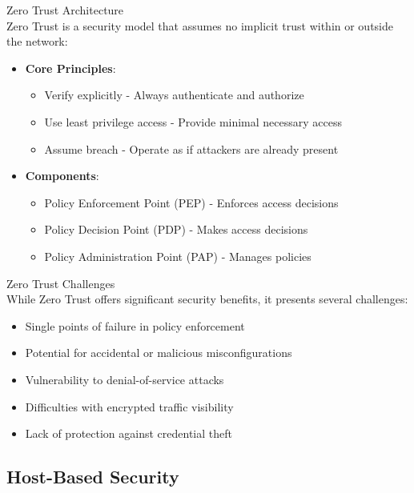 \begin{concept}{Zero Trust Architecture}\\
Zero Trust is a security model that assumes no implicit trust within or outside the network:
\begin{itemize}
    \item \textbf{Core Principles}:
    \begin{itemize}
        \item Verify explicitly - Always authenticate and authorize
        \item Use least privilege access - Provide minimal necessary access
        \item Assume breach - Operate as if attackers are already present
    \end{itemize}
    \item \textbf{Components}:
    \begin{itemize}
        \item Policy Enforcement Point (PEP) - Enforces access decisions
        \item Policy Decision Point (PDP) - Makes access decisions
        \item Policy Administration Point (PAP) - Manages policies
    \end{itemize}
\end{itemize}
\end{concept}

\begin{theorem}{Zero Trust Challenges}\\
While Zero Trust offers significant security benefits, it presents several challenges:
\begin{itemize}
    \item Single points of failure in policy enforcement
    \item Potential for accidental or malicious misconfigurations
    \item Vulnerability to denial-of-service attacks
    \item Difficulties with encrypted traffic visibility
    \item Lack of protection against credential theft
\end{itemize}
\end{theorem}

\subsection{Host-Based Security}


